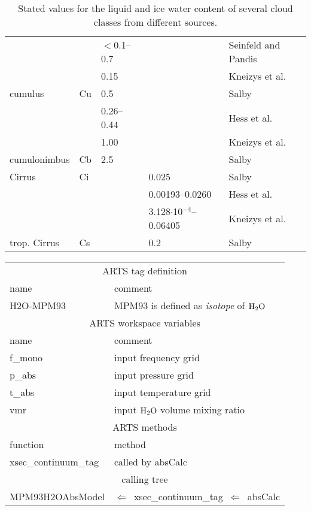 {\begin{table}[!htb]
\begin{center}
\begin{tabular}{lllll}
              &       & $<$0.1--0.7  &    & Seinfeld and Pandis \cite{seinfeld:98}\\
              &       & 0.15         &    & Kneizys et al. \cite{abreu:96}\\
 cumulus      & Cu    & 0.5          &    & Salby \cite{salby:96}\\
              &       & 0.26--0.44   &    & Hess et al. \cite{hess:98}\\
              &       & 1.00         &    & Kneizys et al. \cite{abreu:96}\\
 cumulonimbus & Cb    & 2.5          &    & Salby \cite{salby:96}\\
 Cirrus       & Ci    &              & 0.025 & Salby \cite{salby:96}\\
              &       &              & 0.00193--0.0260 & Hess et al. \cite{hess:98}\\
              &       &              & 3.128$\cdot$10$^{-4}$--0.06405 & Kneizys et al. \cite{abreu:96}\\
 trop. Cirrus & Cs    &              & 0.2   & Salby \cite{salby:96}\\
\hline
\end{tabular}
\caption{Stated values for the liquid and ice water content of several 
  cloud classes from different sources.}
\label{tab:lwc}
\end{center}
\end{table}
%
%
%
\begin{center}
\begin{tabular}{ll}
\hline
\multicolumn{2}{c}{ARTS tag definition}\\
name      & comment \\
H2O-MPM93 & MPM93 is defined as {\it isotope} of $\mbox{H}_2\mbox{O}$\\
\hline
\multicolumn{2}{c}{ARTS workspace variables}\\
name & comment \\
 f\_mono & input frequency grid \\
 p\_abs  & input pressure grid \\
 t\_abs  & input temperature grid\\
 vmr    & input $\mbox{H}_2\mbox{O}$ volume mixing ratio\\
\hline
\multicolumn{2}{c}{ARTS methods}\\
function           & method\\
xsec\_continuum\_tag & called by absCalc \\
\hline
\multicolumn{2}{c}{calling tree}\\
MPM93H2OAbsModel & $\Leftarrow$~xsec\_continuum\_tag~$\Leftarrow$~absCalc\\
\end{tabular}
\end{center}

}
